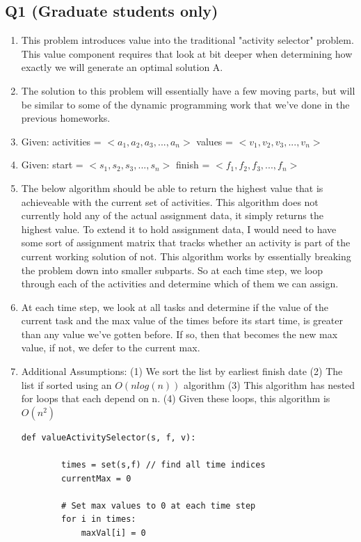 \documentclass{article}
\begin{document}
\subsection*{Q1 (Graduate students only)}
\begin{enumerate}[label=(\alph*)]
    \item This problem introduces value into the traditional "activity selector" problem. This value component requires that look at bit deeper when determining how exactly we will generate an optimal solution A. 
    \item The solution to this problem will essentially have a few moving parts, but will be similar to some of the dynamic programming work that we've done in the previous homeworks.
    \item Given: activities = $<a_1, a_2, a_3,...,a_n>$ values = $<v_1, v_2, v_3,...,v_n>$
    \item Given: start = $<s_1, s_2, s_3,...,s_n>$ finish = $<f_1, f_2, f_3,...,f_n>$
    \item The below algorithm should be able to return the highest value that is achieveable with the current set of activities. This algorithm does not currently hold any of the actual assignment data, it simply returns the highest value. To extend it to hold assignment data, I would need to have some sort of assignment matrix that tracks whether an activity is part of the current working solution of not. This algorithm works by essentially breaking the problem down into smaller subparts. So at each time step, we loop through each of the activities and determine which of them we can assign. 
    \item At each time step, we look at all tasks and determine if the value of the current task and the max value of the times before its start time, is greater than any value we've gotten before. If so, then that becomes the new max value, if not, we defer to the current max.
    \item Additional Assumptions:
    \subitem (1) We sort the list by earliest finish date
    \subitem (2) The list if sorted using an $O(nlog(n))$ algorithm
    \subitem (3) This algorithm has nested for loops that each depend on n.
    \subitem (4) Given these loops, this algorithm is $O(n^2)$
    \begin{lstlisting}[frame=single]
    def valueActivitySelector(s, f, v):
        
        times = set(s,f) // find all time indices
        currentMax = 0

        # Set max values to 0 at each time step
        for i in times:
            maxVal[i] = 0


\end{lstlisting}
\end{enumerate}
\end{document}
